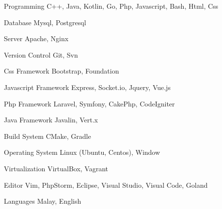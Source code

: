 

\begin{cvskills}

  \cvskill
    {Programming} %
    {C++, Java, Kotlin, Go, Php, Javascript, Bash, Html, Css} %

  \cvskill
    {Database} %
    {Mysql, Postgresql} %
    
  \cvskill
    {Server} %
    {Apache, Nginx} %
    
  \cvskill
    {Version Control} %
    {Git, Svn} %
    
  \cvskill
    {Css Framework} %
    {Bootstrap, Foundation} %
    
  \cvskill
    {Javascript Framework} %
    {Express, Socket.io, Jquery, Vue.js} %

  \cvskill
    {Php Framework} %
    {Laravel, Symfony, CakePhp, CodeIgniter} %
    
  \cvskill
    {Java Framework} %
    {Javalin, Vert.x} %
    
  \cvskill
    {Build System} %
    {CMake, Gradle} %
    
  \cvskill
    {Operating System} %
    {Linux (Ubuntu, Centos), Window} %
    
  \cvskill
    {Virtualization} %
    {VirtualBox, Vagrant} %
    
  \cvskill
    {Editor} %
    {Vim, PhpStorm, Eclipse, Visual Studio, Visual Code, Goland} %
    
  \cvskill
    {Languages} %
    {Malay, English} %

\end{cvskills}
